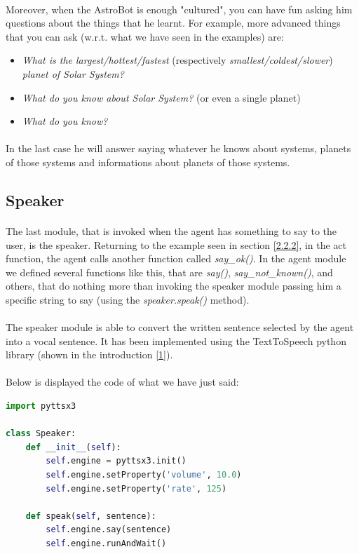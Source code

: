 \documentclass[12pt, a4paper]{article}
\begin{document}
\paragraph{}
Moreover, when the AstroBot is enough "cultured", you can have fun asking him questions about the things that he learnt.
For example, more advanced things that you can ask (w.r.t. what we have seen in the examples) are:
\begin{itemize}
	\item \textit{What is the largest/hottest/fastest} (respectively \textit{smallest/coldest/slower}) \textit{planet of Solar System?}
	\item \textit{What do you know about Solar System?} (or even a single planet)
	\item \textit{What do you know?}
\end{itemize}
\paragraph{}
In the last case he will answer saying whatever he knows about systems, planets of those systems and informations about planets of those systems.

\subsection{Speaker}
\paragraph{}
The last module, that is invoked when the agent has something to say to the user, is the speaker.
Returning to the example seen in section \ref{2.2.2}, in the act function, the agent calls another function called \textit{say\_ok()}.
In the agent module we defined several functions like this, that are \textit{say()}, \textit{say\_not\_known()}, and others, that do nothing more than invoking the speaker module passing him a specific string to say (using the \textit{speaker.speak()} method).
\paragraph{}
The speaker module is able to convert the written sentence selected by the agent into a vocal sentence. It has been implemented using the TextToSpeech python library (shown in the introduction \ref{1}).
\paragraph{}
Below is displayed the code of what we have just said:
\vspace{1em}
\begin{lstlisting}[language=Python]
import pyttsx3

class Speaker:
	def __init__(self):
		self.engine = pyttsx3.init()
		self.engine.setProperty('volume', 10.0)
		self.engine.setProperty('rate', 125)

	def speak(self, sentence):
		self.engine.say(sentence)
		self.engine.runAndWait()
\end{lstlisting}
\end{document}
